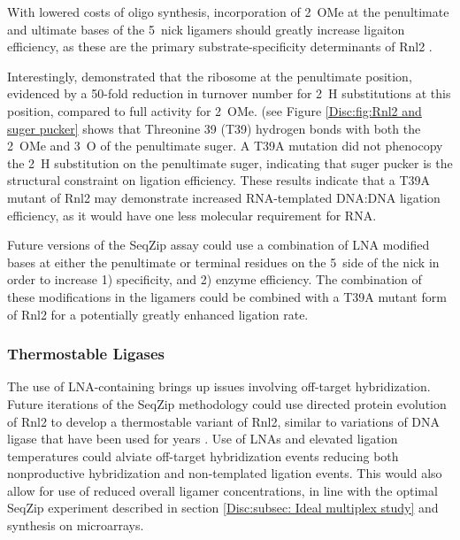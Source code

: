     With lowered costs of oligo synthesis, incorporation of 2\textprime~OMe at the penultimate and ultimate bases of the 5\textprime~nick ligamers should greatly increase ligaiton efficiency, as these are the primary substrate-specificity determinants of Rnl2 \citep{Nandakumar2004a, Nandakumar2006}.

    Interestingly, \citet{Nandakumar2004a} demonstrated that the ribosome at the penultimate position, evidenced by a 50-fold reduction in turnover number for 2\textprime~H substitutions at this position, compared to full activity for 2\textprime~OMe. \citet{Nandakumar2006} (see Figure \ref{Disc:fig:Rnl2 and suger pucker} shows that Threonine 39 (T39) hydrogen bonds with both the 2\textprime~OMe and 3\textprime~O of the penultimate suger. A T39A mutation did not phenocopy the 2\textprime~H substitution on the penultimate suger, indicating that suger pucker is the structural constraint on ligation efficiency. These results indicate that a T39A mutant of Rnl2 may demonstrate increased RNA-templated DNA:DNA ligation efficiency, as it would have one less molecular requirement for RNA.

    Future versions of the SeqZip assay could use a combination of LNA modified bases \citep{You2006} at either the penultimate or terminal residues on the 5\textprime~side of the nick in order to increase 1) specificity, and 2) enzyme efficiency. The combination of these modifications in the ligamers could be combined with a T39A mutant form of Rnl2 for a potentially greatly enhanced ligation rate.

  \subsubsection{Thermostable Ligases}
    \label{Disc:subsec:Thermostable Ligases}

    The use of LNA-containing brings up issues involving off-target hybridization. Future iterations of the SeqZip methodology could use directed protein evolution of Rnl2 \citep{Stemmer1994, Romero2009a} to develop a thermostable variant of Rnl2, similar to variations of DNA ligase that have been used for years \citep{Barany1991}. Use of LNAs and elevated ligation temperatures could alviate off-target hybridization events reducing both nonproductive hybridization and non-templated ligation events. This would also allow for use of reduced overall ligamer concentrations, in line with the optimal SeqZip experiment described in section \ref{Disc:subsec: Ideal multiplex study} and synthesis on microarrays.

